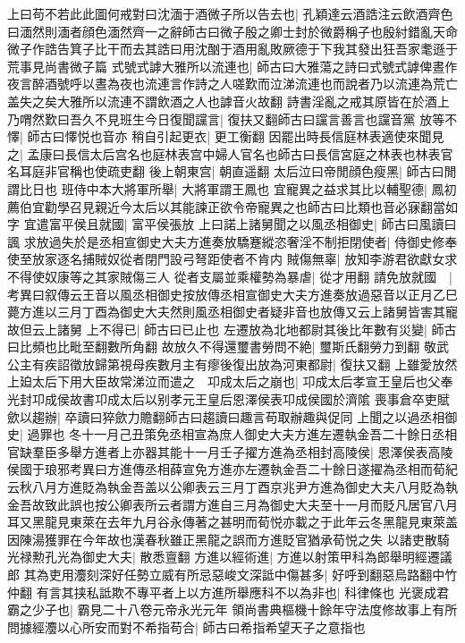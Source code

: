 上曰苟不若此此圖何戒對曰沈湎于酒微子所以告去也|{
	孔穎達云酒誥注云飲酒齊色曰湎然則湎者顔色湎然齊一之辭師古曰微子殷之卿士封於微爵稱子也殷紂錯亂天命微子作誥告箕子比干而去其誥曰用沈酗于酒用亂敗厥德于下我其發出狂吾家耄遜于荒事見尚書微子篇}
式號式謼大雅所以流連也|{
	師古曰大雅蕩之詩曰式號式謼俾晝作夜言醉酒號呼以晝為夜也流連言作詩之人嗟歎而泣涕流連也而說者乃以流連為荒亡盖失之矣大雅所以流連不謂飲酒之人也謼音火故翻}
詩書淫亂之戒其原皆在於酒上乃喟然歎曰吾久不見班生今日復聞讜言|{
	復扶又翻師古曰讜言善言也讜音黨}
放等不懌|{
	師古曰懌悦也音亦}
稍自引起更衣|{
	更工衡翻}
因罷出時長信庭林表適使來聞見之|{
	孟康曰長信太后宫名也庭林表宫中婦人官名也師古曰長信宮庭之林表也林表官名耳庭非官稱也使疏吏翻}
後上朝東宫|{
	朝直遥翻}
太后泣曰帝閒顔色瘦黑|{
	師古曰閒謂比日也}
班侍中本大將軍所舉|{
	大將軍謂王鳳也}
宜寵異之益求其比以輔聖德|{
	鳳初薦伯宜勸學召見親近今太后以其能諫正欲令帝寵異之也師古曰比類也音必寐翻當如字}
宜遣富平侯且就國|{
	富平侯張放}
上曰諾上諸舅聞之以風丞相御史|{
	師古曰風讀曰諷}
求放過失於是丞相宣御史大夫方進奏放驕蹇縱恣奢淫不制拒閉使者|{
	侍御史修奉使至放家逐名捕賊奴從者閉門設弓弩距使者不肯内}
賊傷無辜|{
	放知李游君欲獻女求不得使奴康等之其家賊傷三人}
從者支屬並乘權勢為暴虐|{
	從才用翻}
請免放就國　|{
	考異曰叙傳云王音以風丞相御史按放傳丞相宣御史大夫方進奏放過惡音以正月乙巳薨方進以三月丁酉為御史大夫然則風丞相御史者疑非音也放傳又云上諸舅皆害其寵故但云上諸舅}
上不得已|{
	師古曰已止也}
左遷放為北地都尉其後比年數有災變|{
	師古曰比頻也比毗至翻數所角翻}
故放久不得還璽書勞問不絶|{
	璽斯氏翻勞力到翻}
敬武公主有疾詔徵放歸第視母疾數月主有瘳後復出放為河東都尉|{
	復扶又翻}
上雖愛放然上廹太后下用大臣故常涕泣而遣之　卭成太后之崩也|{
	卭成太后孝宣王皇后也父奉光封卭成侯故書卭成太后以别孝元王皇后恩澤侯表卭成侯國於濟隂}
喪事倉卒吏賦歛以趨辦|{
	卒讀曰猝歛力贍翻師古曰趨讀曰趣言苟取辦趣與促同}
上聞之以過丞相御史|{
	過罪也}
冬十一月己丑策免丞相宣為庶人御史大夫方進左遷執金吾二十餘日丞相官缺羣臣多舉方進者上亦器其能十一月壬子擢方進為丞相封高陵侯|{
	恩澤侯表高陵侯國于琅邪考異曰方進傳丞相薛宣免方進亦左遷執金吾二十餘日遂擢為丞相而荀紀云秋八月方進貶為執金吾盖以公卿表云三月丁酉京兆尹方進為御史大夫八月貶為執金吾故致此誤也按公卿表所云者謂方進自三月為御史大夫至十一月而貶凡居官八月耳又黑龍見東萊在去年九月谷永傳著之甚明而荀悦亦載之于此年云冬黑龍見東萊盖因陳湯獲罪在今年故也漢春秋雖正黑龍之誤而方進貶官猶承荀悦之失}
以諸吏散騎光禄勲孔光為御史大夫|{
	散悉亶翻}
方進以經術進|{
	方進以射策甲科為郎舉明經遷議郎}
其為吏用灋刻深好任勢立威有所忌惡峻文深詆中傷甚多|{
	好呼到翻惡烏路翻中竹仲翻}
有言其挟私詆欺不專平者上以方進所舉應科不以為非也|{
	科律條也}
光褒成君霸之少子也|{
	霸見二十八卷元帝永光元年}
領尚書典樞機十餘年守法度修故事上有所問據經灋以心所安而對不希指苟合|{
	師古曰希指希望天子之意指也}
